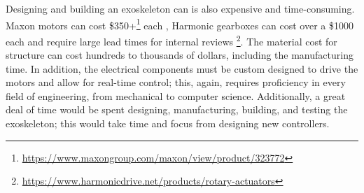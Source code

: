 Designing and building an exoskeleton can is also expensive and time-consuming.  Maxon motors can cost \$350+\footnote{\url{https://www.maxongroup.com/maxon/view/product/323772}} each  , Harmonic gearboxes can cost over a \$1000 each and require large lead times for internal reviews \footnote{\url{https://www.harmonicdrive.net/products/rotary-actuators}}. The material cost for structure can cost hundreds to thousands of dollars, including the manufacturing time. In addition, the electrical components must be custom designed to drive the motors and allow for real-time control; this, again, requires proficiency in every field of engineering, from mechanical to computer science. Additionally, a great deal of time would be spent designing, manufacturing, building, and testing the exoskeleton; this would take time and focus from designing new controllers. 
 

 


